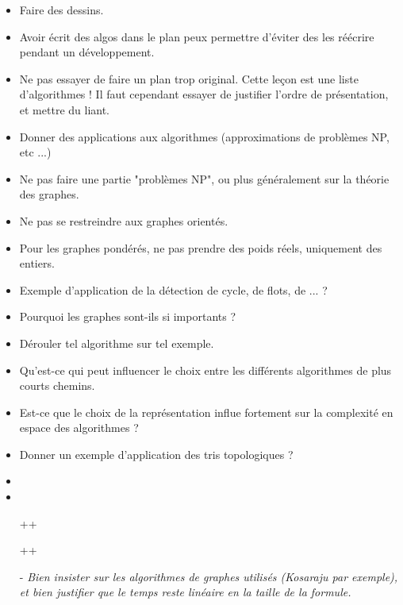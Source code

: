 \documentclass{agregfiche}
\begin{document}
\secpieges

\begin{itemize}
    \item Faire des dessins.
    \item Avoir écrit des algos dans le plan peux permettre d'éviter des les réécrire pendant un développement.
    \item Ne pas essayer de faire un plan trop original. Cette leçon est une liste d'algorithmes ! Il faut cependant essayer de justifier l'ordre de présentation, et mettre du liant.
    \item Donner des applications aux algorithmes (approximations de problèmes NP, etc ...)
    \item Ne pas faire une partie "problèmes NP", ou plus généralement sur la théorie des graphes.
    \item Ne pas se restreindre aux graphes orientés.
    \item Pour les graphes pondérés, ne pas prendre des poids réels, uniquement des entiers.
\end{itemize}

\secquestionsclassiques

\begin{itemize}
    \item Exemple d'application de la détection de cycle, de flots, de ... ?
    \item Pourquoi les graphes sont-ils si importants ?
    \item Dérouler tel algorithme sur tel exemple.
    \item Qu'est-ce qui peut influencer le choix entre les différents algorithmes de plus courts chemins.
    \item Est-ce que le choix de la représentation influe fortement sur la complexité en espace des algorithmes ?
    \item Donner un exemple d'application des tris topologiques ?
\end{itemize}

\secreferences

\begin{itemize}
    \item 
    \item 
\end{itemize}

\secdev

\begin{itemize}
	\item[++] 
	\item[++] 
        \item[-]
          \textit{Bien insister sur les algorithmes de graphes utilisés (Kosaraju par exemple), et bien justifier que le temps reste linéaire en la taille de la formule.}
\end{itemize}
\end{document}
